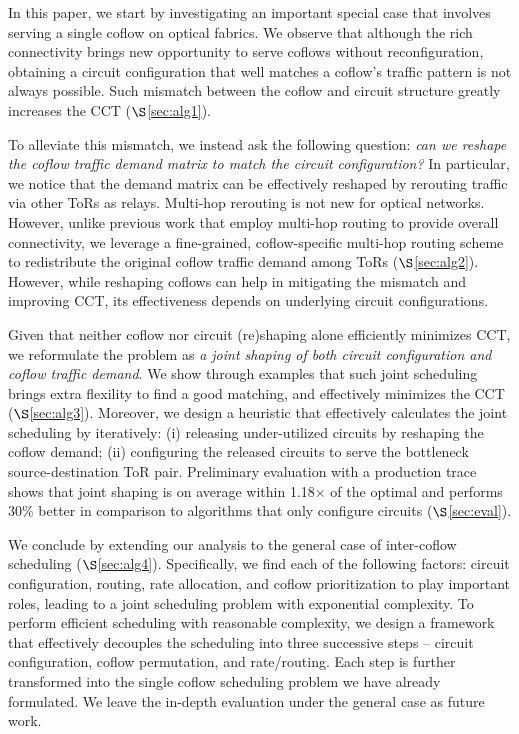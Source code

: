 In this paper, we start by investigating an important special case that involves serving a single coflow on optical fabrics.
We observe that although the rich connectivity brings new opportunity to serve coflows without reconfiguration,
obtaining a circuit configuration that well matches a coflow's traffic pattern is not always possible.
Such mismatch between the coflow and circuit structure greatly increases the CCT ($\S$\ref{sec:alg1}).

To alleviate this mismatch, we instead ask the following question:
\emph{can we reshape the coflow traffic demand matrix to match the circuit configuration?}
In particular, we notice that the demand matrix can be effectively reshaped by rerouting traffic via other ToRs as relays.
Multi-hop rerouting is not new for optical networks.
However, unlike previous work \cite{osa} that employ multi-hop routing to provide overall connectivity, we leverage a fine-grained, coflow-specific multi-hop routing scheme to redistribute the original coflow traffic demand among ToRs ($\S$\ref{sec:alg2}).
However, while reshaping coflows can help in mitigating the mismatch and improving CCT, its effectiveness depends on underlying circuit configurations.

Given that neither coflow nor circuit (re)shaping alone efficiently minimizes CCT, we reformulate the problem as \emph{a joint shaping of both circuit configuration and coflow traffic demand}.
We show through examples that such joint scheduling brings extra flexility to find a good matching, and effectively minimizes the CCT ($\S$\ref{sec:alg3}).
Moreover, we design a heuristic that effectively calculates the joint scheduling by
iteratively:
(i) releasing under-utilized circuits by reshaping the coflow demand;
(ii) configuring the released circuits to serve the bottleneck source-destination ToR pair.
Preliminary evaluation with a production trace shows that
joint shaping is on average within 1.18$\times$ of the optimal and performs $30\%$ better in comparison to algorithms that only configure circuits ($\S$\ref{sec:eval}).

We conclude by extending our analysis to the general case of inter-coflow scheduling ($\S$\ref{sec:alg4}).
Specifically, we find each of the following factors: circuit configuration, routing, rate allocation, and coflow prioritization to play important roles, leading to a joint scheduling problem with exponential complexity.
To perform efficient scheduling with reasonable complexity, we design a framework that effectively decouples the scheduling into three successive steps -- circuit configuration, coflow permutation, and rate/routing.
Each step is further transformed into the single coflow scheduling problem we have already formulated.
We leave the in-depth evaluation under the general case as future work.
